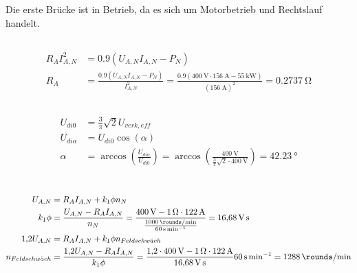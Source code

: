 \documentclass[11pt,a4paper]{scrartcl}
\newcommand{\mybr}[1]{\left(#1\right)}
\newcommand{\0}{_{\mybr{0}}}
\newcommand{\1}{_{\mybr{1}}}
\newcommand{\2}{_{\mybr{2}}}
\begin{document}
Die erste Brücke ist in Betrieb, da es sich um Motorbetrieb und Rechtslauf handelt.

\subsection{}
\begin{align}
R_A I_{A,N}^2&=\num{0.9}\mybr{U_{A,N}I_{A,N}-P_N}\\
R_A&=\frac{\num{0.9}\mybr{U_{A,N}I_{A,N}-P_N}}{I_{A,N}^2}=\frac{\num{0.9}\mybr{\SI{400}{\volt}\cdot\SI{156}{\ampere}-\SI{55}{\kilo\watt}}}{\mybr{\SI{156}{\ampere}}^2}=\SI{0.2737}{\ohm}
\end{align}

\subsection{}
\begin{align}
U_{di0}&=\frac{3}{\pi}\sqrt{2}U_{verk,eff}\\
U_{di\alpha}&=U_{di0}\cos\mybr{\alpha}\\
\alpha&=\arccos\mybr{\frac{U_{di\alpha}}{U_{di0}}}=\arccos\mybr{\frac{\SI{400}{\volt}}{\frac{3}{\pi}\sqrt{2}\cdot\SI{400}{\volt}}}=\SI{42.23}{\degree}
\end{align}

\section{}
\subsection{}
\begin{align}
U_{A,N}&=R_A I_{A,N}+k_1\phi n_N\\
k_1\phi&=\frac{U_{A,N}-R_A I_{A,N}}{n_N}=\frac{\SI{400}{\volt}-\SI{1}{\ohm}\cdot\SI{122}{\ampere}}{\frac{\SI{1000}{\rounds\per\minute}}{\SI{60}{\second\per\minute}}}=\SI{16.68}{\volt\second}\\
\num{1.2}U_{A,N}&=R_A I_{A,N}+k_1\phi n_{Feldschw\ddot{a}ch}\\
n_{Feldschw\ddot{a}ch}&=\frac{\num{1.2}U_{A,N}-R_A I_{A,N}}{k_1\phi}=\frac{\num{1.2}\cdot\SI{400}{\volt}-\SI{1}{\ohm}\cdot\SI{122}{\ampere}}{\SI{16.68}{\volt\second}}\SI{60}{\second\per\minute}=\SI{1288}{\rounds\per\minute}
\end{align}
\end{document}
